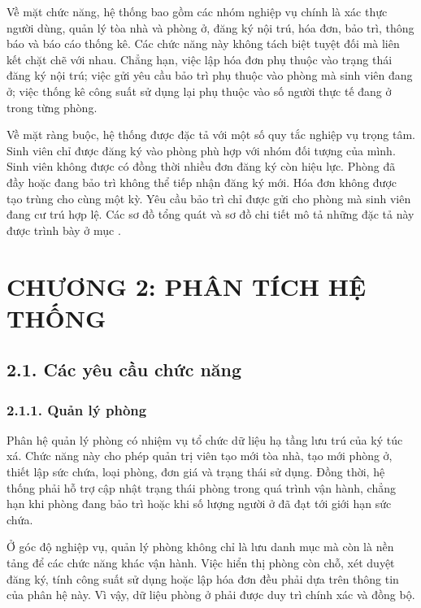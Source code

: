 \documentclass[12pt]{article}
\begin{document}
Về mặt chức năng, hệ thống bao gồm các nhóm nghiệp vụ chính là xác thực người dùng, quản lý tòa nhà và phòng ở, đăng ký nội trú, hóa đơn, bảo trì, thông báo và báo cáo thống kê. Các chức năng này không tách biệt tuyệt đối mà liên kết chặt chẽ với nhau. Chẳng hạn, việc lập hóa đơn phụ thuộc vào trạng thái đăng ký nội trú; việc gửi yêu cầu bảo trì phụ thuộc vào phòng mà sinh viên đang ở; việc thống kê công suất sử dụng lại phụ thuộc vào số người thực tế đang ở trong từng phòng.

Về mặt ràng buộc, hệ thống được đặc tả với một số quy tắc nghiệp vụ trọng tâm. Sinh viên chỉ được đăng ký vào phòng phù hợp với nhóm đối tượng của mình. Sinh viên không được có đồng thời nhiều đơn đăng ký còn hiệu lực. Phòng đã đầy hoặc đang bảo trì không thể tiếp nhận đăng ký mới. Hóa đơn không được tạo trùng cho cùng một kỳ. Yêu cầu bảo trì chỉ được gửi cho phòng mà sinh viên đang cư trú hợp lệ. Các sơ đồ tổng quát và sơ đồ chi tiết mô tả những đặc tả này được trình bày ở mục \cite{làm sau}.

\newpage
\section*{CHƯƠNG 2: PHÂN TÍCH HỆ THỐNG}

\subsection*{2.1. Các yêu cầu chức năng}

\subsubsection*{2.1.1. Quản lý phòng}
Phân hệ quản lý phòng có nhiệm vụ tổ chức dữ liệu hạ tầng lưu trú của ký túc xá. Chức năng này cho phép quản trị viên tạo mới tòa nhà, tạo mới phòng ở, thiết lập sức chứa, loại phòng, đơn giá và trạng thái sử dụng. Đồng thời, hệ thống phải hỗ trợ cập nhật trạng thái phòng trong quá trình vận hành, chẳng hạn khi phòng đang bảo trì hoặc khi số lượng người ở đã đạt tới giới hạn sức chứa.

Ở góc độ nghiệp vụ, quản lý phòng không chỉ là lưu danh mục mà còn là nền tảng để các chức năng khác vận hành. Việc hiển thị phòng còn chỗ, xét duyệt đăng ký, tính công suất sử dụng hoặc lập hóa đơn đều phải dựa trên thông tin của phân hệ này. Vì vậy, dữ liệu phòng ở phải được duy trì chính xác và đồng bộ.
\end{document}
